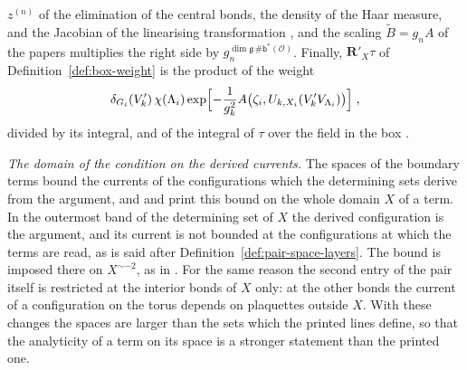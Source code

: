 \documentclass[11pt]{preprint}
\numberwithin{equation}{section}
\begin{document}
$z^{(n)}$ of the elimination of the central bonds, the density of the Haar measure, and the Jacobian of the linearising transformation \cite[(2.10)--(2.12), pp.~267--268]{BalabanRG1}, and the scaling $\tilde B = g_nA$ of the papers multiplies the right side by $g_n^{\dim\mathfrak g\,\#\mathsf b^*(\mathcal O)}$. Finally, $\mathbf R'_X\tau$ of Definition~\ref{def:box-weight} is the product of the weight
\[
    \delta_{G_i}(V'_k)\,\chi(\Lambda_i)\exp\Bigl[-\frac{1}{g_k^2}A\bigl(\zeta_i, U_{k,X_i}(V'_kV_{\Lambda_i})\bigr)\Bigr]\;,
\]
divided by its integral, and of the integral of $\tau$ over the field in the box \cite[(1.100), (1.101)]{BalabanLFR1}.

\emph{The domain of the condition on the derived currents.} The spaces of the boundary terms bound the currents of the configurations which the determining sets derive from the argument, and \cite[(2.37), p.~261]{BalabanCRE} and \cite[p.~190]{BalabanLFR1} print this bound on the whole domain $X$ of a term. In the outermost band of the determining set of $X$ the derived configuration is the argument, and its current is not bounded at the configurations at which the terms are read, as is said after Definition~\ref{def:pair-space-layers}. The bound is imposed there on $X^{\sim-2}$, as in \cite[(1.16), p.~262]{BalabanRG1}. For the same reason the second entry of the pair itself is restricted at the interior bonds of $X$ only: at the other bonds the current of a configuration on the torus depends on plaquettes outside $X$. With these changes the spaces are larger than the sets which the printed lines define, so that the analyticity of a term on its space is a stronger statement than the printed one.
\end{document}
